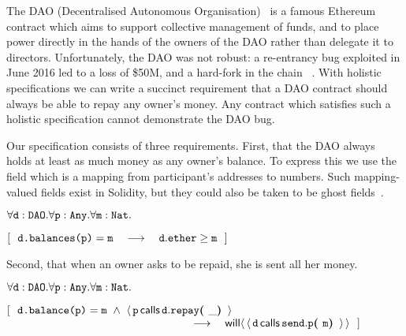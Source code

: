 The DAO  {(Decentralised Autonomous Organisation)}~\cite{Dao}  is a famous Ethereum contract  which aims to support
collective management of funds,  and to place power directly in the
hands of the owners of the DAO
rather than delegate it to directors.
Unfortunately, the DAO was not robust:
a re-entrancy bug   exploited in June 2016 led  to a loss of   \$50M, and
a hard-fork in the  chain ~\cite{DaoBug}.
%
With holistic specifications  we can  write a succinct requirement that a
DAO contract should always be able to repay any owner's money.
Any contract which satisfies such a holistic specification cannot demonstrate the DAO bug.
 
Our specification consists of three requirements.
First, that the DAO always holds at least as 
much money as any owner's balance.
To express this we use 
the field  which is a mapping from participant's addresses to 
numbers. Such mapping-valued fields exist in Solidity, but they could
also be taken to be ghost fields~\cite{ghost}.
  
\vspace{.1cm}

\noindent
 \strut \hspace{0.5cm} $\forall \prg{d}:\prg{DAO}.\forall \prg{p}:\prg{Any}.\forall\prg{m}:\prg{Nat}.$\\
\strut \hspace{0.5cm} $[\ \ \prg{d.balances(p)}=\prg{m}  \ \ \  \longrightarrow  \ \ \ \prg{d}.\prg{ether}\geq \prg{m} \ \ ] $


\noindent
Second, that when an owner asks to be repaid, she is sent all her money.
\vspace{.1cm}

\noindent
 \strut \hspace{0.5cm} $\forall \prg{d}:\prg{DAO}.\forall \prg{p}:\prg{Any}.\forall\prg{m}:\prg{Nat}.$\\
\strut \hspace{0.5cm} $[\ \ \prg{d.balance(p)}=\prg{m}
 \ \wedge \ \Calls{\prg{p}}{\prg{repay}}{\prg{d}}{\_}  $\\
 $\strut \hspace{5.5cm}   \ \ \  \longrightarrow  \ \ \  \Future{\Calls{\prg{d}}{\prg{p}}{\prg{send}}{\prg{m}}}\ \ ] $  
\vspace{.1cm}

 

